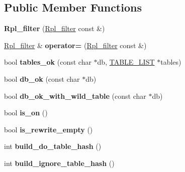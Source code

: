 \subsection*{Public Member Functions}
\begin{DoxyCompactItemize}
\item 
\mbox{\label{classRpl__filter_a4a95e17c9cacdaa607339bc4209bc11f}} 
{\bfseries Rpl\+\_\+filter} (\mbox{\hyperlink{classRpl__filter}{Rpl\+\_\+filter}} const \&)
\item 
\mbox{\label{classRpl__filter_ae68c140ca5ec2dacb81f452fde594621}} 
\mbox{\hyperlink{classRpl__filter}{Rpl\+\_\+filter}} \& {\bfseries operator=} (\mbox{\hyperlink{classRpl__filter}{Rpl\+\_\+filter}} const \&)
\item 
\mbox{\label{classRpl__filter_a433e8e28428d5f5662643bbd55b82a7e}} 
bool {\bfseries tables\+\_\+ok} (const char $\ast$db, \mbox{\hyperlink{structTABLE__LIST}{T\+A\+B\+L\+E\+\_\+\+L\+I\+ST}} $\ast$tables)
\item 
\mbox{\label{classRpl__filter_a7677de6f8c9d2e0717879887802882d2}} 
bool {\bfseries db\+\_\+ok} (const char $\ast$db)
\item 
\mbox{\label{classRpl__filter_a97ab840ae0de3cd924bf90f782d62f73}} 
bool {\bfseries db\+\_\+ok\+\_\+with\+\_\+wild\+\_\+table} (const char $\ast$db)
\item 
\mbox{\label{classRpl__filter_a52976f7d6320917f6fd731ad848c3846}} 
bool {\bfseries is\+\_\+on} ()
\item 
\mbox{\label{classRpl__filter_a85e22ec6690d10de74ebc0b4f2d70795}} 
bool {\bfseries is\+\_\+rewrite\+\_\+empty} ()
\item 
\mbox{\label{classRpl__filter_a48b2c0a16378425489cf8cb763dac990}} 
int {\bfseries build\+\_\+do\+\_\+table\+\_\+hash} ()
\item 
\mbox{\label{classRpl__filter_a03b77495e92a54fa7e1c1cbb32f21345}} 
int {\bfseries build\+\_\+ignore\+\_\+table\+\_\+hash} ()
\item 

\end{DoxyCompactItemize}
